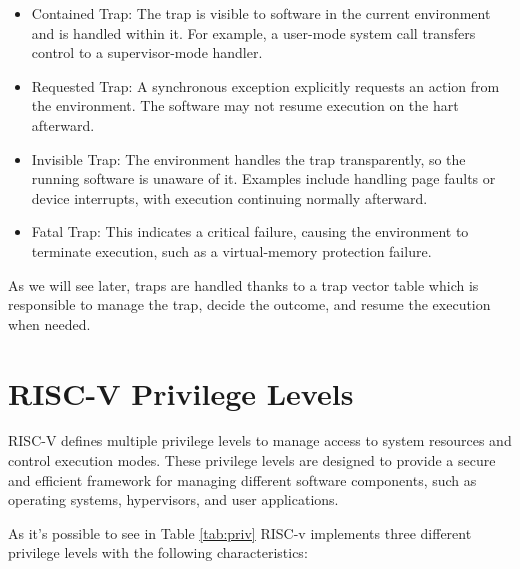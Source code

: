 \begin{itemize}
  \item Contained Trap: The trap is visible to software in the current
    environment and is handled within it. For example, a user-mode system call
    transfers control to a supervisor-mode handler.

  \item Requested Trap: A synchronous exception explicitly requests an action
    from the environment. The software may not resume execution on the hart afterward.

  \item Invisible Trap: The environment handles the trap transparently, so the running
    software is unaware of it. Examples include handling page faults or device
    interrupts, with execution continuing normally afterward.

  \item Fatal Trap: This indicates a critical failure, causing the environment to
    terminate execution, such as a virtual-memory protection failure.
\end{itemize}

As we will see later, traps are handled thanks to a trap vector table which is
responsible to manage the trap, decide the outcome, and resume the execution
when needed.

\section{RISC-V Privilege Levels}
\label{sec:riscv_privileges}

RISC-V defines multiple privilege levels to manage access to system resources and
control execution modes. These privilege levels are designed to provide a secure
and efficient framework for managing different software components, such as operating
systems, hypervisors, and user applications.

As it's possible to see in Table \ref{tab:priv} RISC-v implements three different
privilege levels with the following characteristics:

